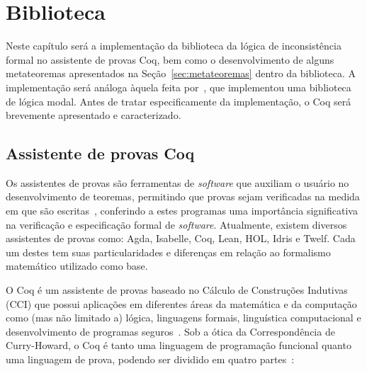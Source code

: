 \chapter{Biblioteca}\label{cap:biblioteca}

Neste capítulo será  a implementação da biblioteca da lógica de inconsistência formal \lfium{} no assistente de provas Coq, bem como o desenvolvimento de alguns metateoremas apresentados na Seção~\ref{sec:metateoremas} dentro da biblioteca. A implementação será análoga àquela feita por~, que implementou uma biblioteca de lógica modal. Antes de tratar especificamente da implementação, o Coq será brevemente apresentado e caracterizado.

\section{Assistente de provas Coq}\label{sec:coq}
    Os assistentes de provas são ferramentas de \textit{software} que auxiliam o usuário no desenvolvimento de teoremas, permitindo que provas sejam verificadas na medida em que são escritas~\cite{geuvers2009proof}, conferindo a estes programas uma importância significativa na verificação e especificação formal de \textit{software}. Atualmente, existem diversos assistentes de provas como: Agda, Isabelle, Coq, Lean, HOL, Idris e Twelf. Cada um destes tem suas particularidades e diferenças em relação ao formalismo matemático utilizado como base.

    O Coq é um assistente de provas baseado no Cálculo de Construções Indutivas (CCI) que possui aplicações em diferentes áreas da matemática e da computação como (mas não limitado a) lógica, linguagens formais, linguística computacional e desenvolvimento de programas seguros~\cite{coqart}. Sob a ótica da Correspondência de Curry{-}Howard, o Coq é tanto uma linguagem de programação funcional quanto uma linguagem de prova, podendo ser dividido em quatro partes~\cite{silva2019certificaccao}:
    
